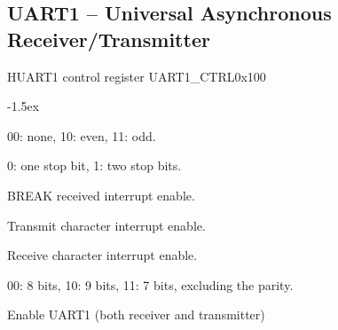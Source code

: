 \documentclass[12pt]{article}
\begin{document}
\subsection{UART1 -- Universal Asynchronous Receiver/Transmitter}

\begin{register}{H}{UART1 control register UART1\_CTRL}{0x100}
\label{uart1ctrl}
%
%
%
%
%
%
%
%
\regnewline%
\end{register}
\begin{regdesc}[0.75\textwidth]\begin{reglist}[000000]
\itemsep-1.5ex
\item[PARITY] 00: none, 10: even, 11: odd.
\item[SP2] 0: one stop bit, 1: two stop bits.
\item[BRIE] BREAK received interrupt enable.
\item[TCIE] Transmit character interrupt enable.
\item[RCIE] Receive character interrupt enable.
\item[SIZE] 00: 8 bits, 10: 9 bits, 11: 7 bits, excluding the parity.
\item[EN] Enable UART1 (both receiver and transmitter)
\end{reglist}\end{regdesc}
\end{document}
